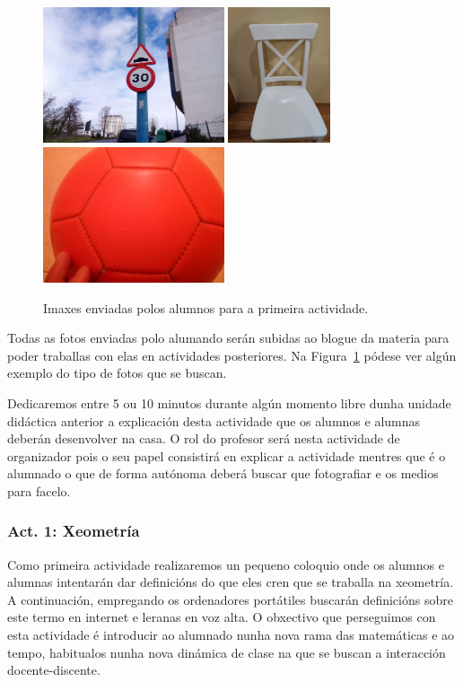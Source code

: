 \begin{figure}[h!]
  \centering
  \includegraphics[height=4cm]{img/act0-1.jpg}
  \includegraphics[height=4cm]{img/act0-2.jpg}
  \includegraphics[height=4cm]{img/act0-3.jpg}
  \caption{Imaxes enviadas polos alumnos para a primeira actividade.}\label{fig:act0}
\end{figure}

Todas as fotos enviadas polo alumando serán subidas ao blogue da materia para poder traballas con elas en actividades posteriores. Na Figura~\ref{fig:act0} pódese ver algún exemplo do tipo de fotos que se buscan.

Dedicaremos entre 5 ou 10 minutos durante algún momento libre dunha unidade didáctica anterior a explicación desta actividade que os alumnos e alumnas deberán desenvolver na casa. O rol do profesor será nesta actividade de organizador pois o seu papel consistirá en explicar a actividade mentres que é o alumnado o que de forma autónoma deberá buscar que fotografiar e os medios para facelo.

\subsubsection{Act. 1: Xeometría}\label{act:xeometria}
Como primeira actividade realizaremos un pequeno coloquio onde os alumnos e alumnas intentarán dar definicións do que eles cren que se traballa na xeometría. A continuación, empregando os ordenadores portátiles buscarán definicións sobre este termo en internet e leranas en voz alta. O obxectivo que perseguimos con esta actividade é introducir ao alumnado nunha nova rama das matemáticas e ao tempo, habitualos nunha nova dinámica de clase na que se buscan a interacción docente-discente.

